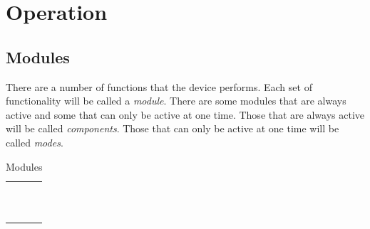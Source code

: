 \part{Operation} \label{Operation}

\chapter{Modules} \label{Modules}

There are a number of functions that the device performs.  Each set of
functionality will be called a \textit{module}.  There are some modules that are
always active and some that can only be active at one time.  Those that are
always active will be called \textit{components}.  Those that can only be active
at one time will be called \textit{modes}.

\begin{table}[H]
\centering
\begin{tabu} { X[1,c,m] | X[1,c,m] }
  \thrule

  & \hyperref[Audio]{} \\
   & \hyperref[Alarm]{} \\
  & \hyperref[Power]{} \\ 

  & \hyperref[Clock]{} \\
  & \hyperref[Set Alarm]{}  \\
  & \hyperref[Timer]{} \\
   & \hyperref[Set Clock]{} \\
  & \hyperref[Power Settings]{} \\
  & \hyperref[Touch Settings]{} \\
  & \hyperref[Set Night Light]{} \\
  \bhrule
\end{tabu}
\caption {Modules}
\end{table}

